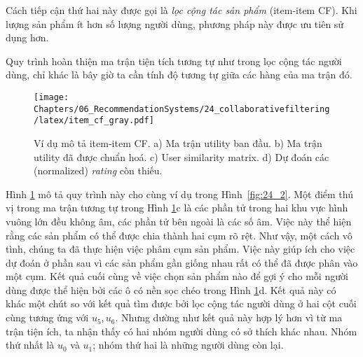 Cách tiếp cận thứ hai này được gọi là \textit{lọc cộng tác sản phẩm} ({item-item CF}). Khi lượng sản phẩm ít hơn số lượng người dùng, phương
pháp này được ưu tiên sử dụng hơn.

Quy trình hoàn thiện ma trận tiện tích tương tự như trong lọc cộng tác người dùng, chỉ khác là bây giờ ta cần tính độ tương tự giữa các hàng của ma trận đó.

\begin{figure}[t]
\centering
\texttt{[image: Chapters/06\_RecommendationSystems/24\_collaborativefiltering/latex/item\_cf\_gray.pdf]}
\caption[]{Ví dụ mô tả item-item CF. a) Ma trận utility
ban đầu. b) Ma trận utility  đã được chuẩn hoá. c) User similarity matrix.
d) Dự đoán các (normalized) \textit{rating} còn thiếu.}
\label{fig:24_3}
\end{figure}

Hình \ref{fig:24_3} mô tả quy trình này cho cùng ví dụ trong Hình~\ref{fig:24_2}. Một điểm
thú vị trong ma trận tương tự trong Hình \ref{fig:24_3}c là các phần tử trong
hai khu vực hình vuông lớn đều không âm, các phần tử bên ngoài
là các số âm. Việc này thể hiện rằng các sản phẩm có thể được chia thành
hai cụm rõ rệt. Như vậy, một cách {vô tình}, chúng ta đã thực
hiện việc phâm cụm sản phẩm. Việc này giúp ích cho việc dự
đoán ở phần sau vì các sản phẩm gần giống nhau rất có thể đã được phân vào
một cụm.
Kết quả cuối cùng về việc chọn sản phẩm nào để gợi ý cho mỗi
người dùng được thể hiện bởi các ô có nền sọc chéo trong Hình \ref{fig:24_3}d. Kết quả
này có khác một chút so với kết quả tìm được bởi lọc cộng tác người dùng ở hai cột cuối
cùng tương ứng với $u_5, u_6$. Nhưng dường như kết quả này {hợp lý} hơn vì từ ma trận tiện ích, ta nhận thấy có hai nhóm người dùng có sở thích khác nhau. Nhóm thứ nhất là $u_0$ và $u_1$; nhóm thứ hai là những người dùng còn lại.

